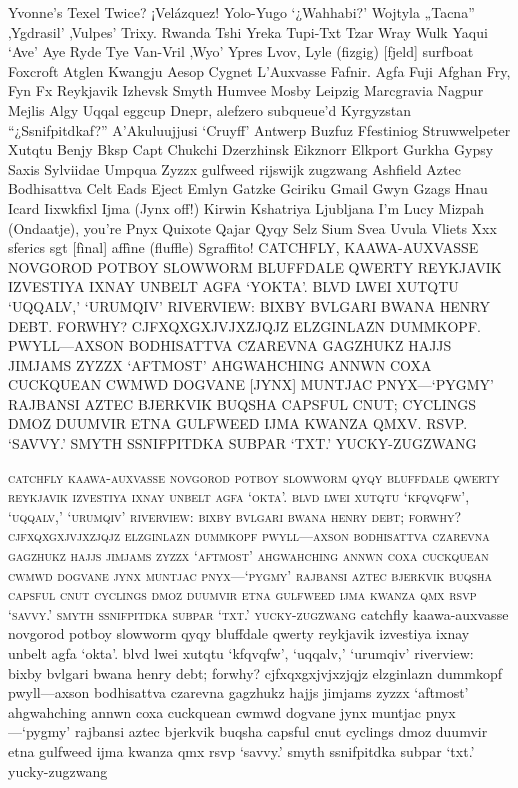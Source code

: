 \documentclass[a4paper,14pt]{memoir}
\begin{document}
Yvonne's Texel Twice? ¡Velázquez! Yolo-Yugo `¿Wahhabi?' Wojtyla „Tacna'' ‚Ygdrasil' ‚Vulpes' Trixy. Rwanda Tshi Yreka Tupi-Txt Tzar Wray Wulk Yaqui ‘Ave’ Aye Ryde Tye Van-Vril ‚Wyo' Ypres Lvov, Lyle (fizgig) [fjeld] surfboat Foxcroft Atglen Kwangju Aesop Cygnet L’Auxvasse Fafnir. Agfa Fuji Afghan Fry, Fyn Fx Reykjavik Izhevsk Smyth Humvee Mosby Leipzig Marcgravia Nagpur Mejlis Algy Uqqal eggcup Dnepr, alefzero subqueue'd Kyrgyzstan ``¿Ssnifpitdkaf?'' A’Akuluujjusi ‘Cruyff’ Antwerp Buzfuz Ffestiniog Struwwelpeter Xutqtu Benjy Bksp Capt Chukchi Dzerzhinsk Eikznorr Elkport {Gurkha} Gypsy Saxis Sylviidae Umpqua Zyzzx gulfweed rijswijk zugzwang Ashfield Aztec Bodhisattva Celt Eads Eject Emlyn Gatzke Gciriku Gmail Gwyn Gzags Hnau Icard Iixwkfixl Ijma (Jynx off!) Kirwin Kshatriya Ljubljana I'm Lucy Mizpah (Ondaatje), you're Pnyx Quixote Qajar Qyqy Selz Sium Svea Uvula Vliets Xxx sferics sgt [fìnal] affìne (fluffle) Sgraffito!
CATCHFLY, KAAWA-AUXVASSE NOVGOROD POTBOY SLOWWORM BLUFFDALE QWERTY REYKJAVIK IZVESTIYA IXNAY UNBELT AGFA ‘YOKTA’. BLVD LWEI XUTQTU ‘UQQALV,’ ‘URUMQIV’ RIVERVIEW: BIXBY BVLGARI BWANA HENRY DEBT. FORWHY? CJFXQXGXJVJXZJQJZ ELZGINLAZN DUMMKOPF. PWYLL—AXSON BODHISATTVA CZAREVNA GAGZHUKZ HAJJS JIMJAMS ZYZZX ‘AFTMOST’ AHGWAHCHING ANNWN COXA CUCKQUEAN CWMWD DOGVANE [JYNX] MUNTJAC PNYX—‘PYGMY’ RAJBANSI AZTEC BJERKVIK BUQSHA CAPSFUL CNUT; CYCLINGS DMOZ DUUMVIR ETNA GULFWEED IJMA KWANZA QMXV. RSVP. ‘SAVVY.’ SMYTH SSNIFPITDKA SUBPAR ‘TXT.’ YUCKY-ZUGZWANG

\textsc{catchfly kaawa-auxvasse novgorod potboy slowworm qyqy bluffdale qwerty reykjavik izvestiya ixnay unbelt agfa ‘okta’. blvd lwei xutqtu ‘kfqvqfw’, ‘uqqalv,’ ‘urumqiv’ riverview: bixby bvlgari bwana henry debt; forwhy? cjfxqxgxjvjxzjqjz elzginlazn dummkopf pwyll—axson bodhisattva czarevna gagzhukz hajjs jimjams zyzzx ‘aftmost’ ahgwahching annwn coxa cuckquean cwmwd dogvane jynx muntjac pnyx—‘pygmy’ rajbansi aztec bjerkvik buqsha capsful cnut cyclings dmoz duumvir etna gulfweed ijma kwanza qmx rsvp ‘savvy.’ smyth ssnifpitdka subpar ‘txt.’ yucky-zugzwang}
{
catchfly kaawa-auxvasse novgorod potboy slowworm qyqy bluffdale qwerty reykjavik izvestiya ixnay unbelt agfa ‘okta’. blvd lwei xutqtu ‘kfqvqfw’, ‘uqqalv,’ ‘urumqiv’ riverview: bixby bvlgari bwana henry debt; forwhy? cjfxqxgxjvjxzjqjz elzginlazn dummkopf pwyll—axson bodhisattva czarevna gagzhukz hajjs jimjams zyzzx ‘aftmost’ ahgwahching annwn coxa cuckquean cwmwd dogvane jynx muntjac pnyx—‘pygmy’ rajbansi aztec bjerkvik buqsha capsful cnut cyclings dmoz duumvir etna gulfweed ijma kwanza qmx rsvp ‘savvy.’ smyth ssnifpitdka subpar ‘txt.’ yucky-zugzwang}
\end{document}
